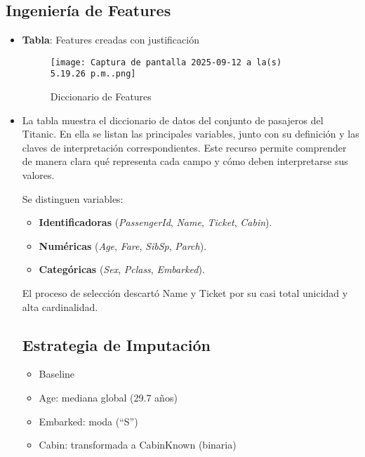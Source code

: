 \documentclass[sjournal]{IEEEtran}
\begin{document}
\subsection{Ingeniería de Features}
\begin{itemize}
    \item  \textbf{Tabla}: Features creadas con justificación
\begin{figure}
    \centering
    \texttt{[image: Captura de pantalla 2025-09-12 a la(s) 5.19.26 p.m..png]}
    \caption{Diccionario de Features}
    \label{fig:placeholder}
\end{figure}

\item La tabla muestra el diccionario de datos del conjunto de pasajeros del Titanic. En ella se listan las principales variables, junto con su definición y las claves de interpretación correspondientes. Este recurso permite comprender de manera clara qué representa cada campo y cómo deben interpretarse sus valores.

Se distinguen variables:

\begin{itemize}
    \item \textbf{Identificadoras} (\textit{PassengerId}, \textit{Name}, \textit{Ticket}, \textit{Cabin}).
    \item \textbf{Numéricas} (\textit{Age}, \textit{Fare}, \textit{SibSp}, \textit{Parch}).
    \item \textbf{Categóricas} (\textit{Sex}, \textit{Pclass}, \textit{Embarked}).
\end{itemize}

El proceso de selección descartó Name y Ticket por su casi total unicidad y alta cardinalidad.

\subsection*{Estrategia de Imputación}
    \begin{itemize}
        \item Baseline

\item Age: mediana global (29.7 años)

\item Embarked: moda (“S”)

\item Cabin: transformada a CabinKnown (binaria)

    \end{itemize}
\end{itemize}
\end{document}

